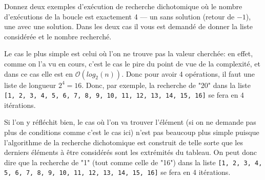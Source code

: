 \documentclass[12pt]{article}
\begin{document}
	\begin{MonExo}
		Donnez deux exemples d'exécution de recherche dichotomique où le nombre d'exécutions de la boucle est exactement 4 --- un sans solution (retour de $-1$), une avec une solution. Dans les deux cas il vous est demandé de donner la liste considérée et le nombre recherché.
	\end{MonExo}
	\begin{MaReponse}
		Le cas le plus simple est celui où l'on ne trouve pas la valeur cherchée: en effet, comme on l'a vu en cours, c'est le cas le pire du point de vue de la complexité, et dans ce cas elle est en $\mathcal{O}(log_2(n))$. Donc pour avoir 4 opérations, il faut une liste de longueur $2^4 = 16$. Donc, par exemple, la recherche de "20" dans la liste \texttt{[1, 2, 3, 4, 5, 6, 7, 8, 9, 10, 11, 12, 13, 14, 15, 16]} se fera en 4 itérations.
		
		Si l'on y réfléchit bien, le cas où l'on va trouver l'élément (si on ne demande pas plus de conditions comme c'est le cas ici) n'est pas beaucoup plus simple puisque l'algorithme de la recherche dichotomique est construit de telle sorte que les derniers éléments à être considérés sont les extrémités du tableau. On peut donc dire que la recherche de "1" (tout comme celle de "16") dans la liste \texttt{[1, 2, 3, 4, 5, 6, 7, 8, 9, 10, 11, 12, 13, 14, 15, 16]} se fera en 4 itérations.
	\end{MaReponse}
	
\end{document}
